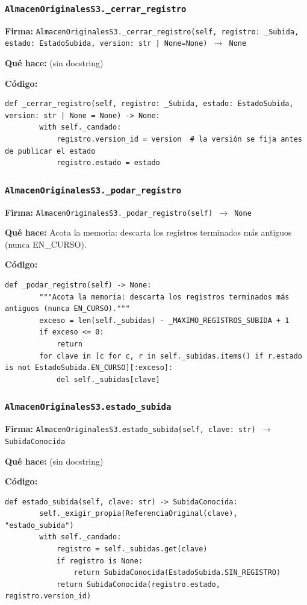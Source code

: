 \documentclass[11pt,a4paper]{article}
\begin{document}
\subsubsection*{\texttt{AlmacenOriginalesS3.\_cerrar\_registro}}
\textbf{Firma:} \texttt{AlmacenOriginalesS3.\_cerrar\_registro(self, registro: \_Subida, estado: EstadoSubida, version: str | None=None) $\rightarrow$ None}

\textbf{Qué hace:} (sin docstring)

\textbf{Código:}
\begin{lstlisting}
def _cerrar_registro(self, registro: _Subida, estado: EstadoSubida, version: str | None = None) -> None:
        with self._candado:
            registro.version_id = version  # la versión se fija antes de publicar el estado
            registro.estado = estado
\end{lstlisting}

\subsubsection*{\texttt{AlmacenOriginalesS3.\_podar\_registro}}
\textbf{Firma:} \texttt{AlmacenOriginalesS3.\_podar\_registro(self) $\rightarrow$ None}

\textbf{Qué hace:} Acota la memoria: descarta los registros terminados más antiguos (nunca EN\_CURSO).

\textbf{Código:}
\begin{lstlisting}
def _podar_registro(self) -> None:
        """Acota la memoria: descarta los registros terminados más antiguos (nunca EN_CURSO)."""
        exceso = len(self._subidas) - _MAXIMO_REGISTROS_SUBIDA + 1
        if exceso <= 0:
            return
        for clave in [c for c, r in self._subidas.items() if r.estado is not EstadoSubida.EN_CURSO][:exceso]:
            del self._subidas[clave]
\end{lstlisting}

\subsubsection*{\texttt{AlmacenOriginalesS3.estado\_subida}}
\textbf{Firma:} \texttt{AlmacenOriginalesS3.estado\_subida(self, clave: str) $\rightarrow$ SubidaConocida}

\textbf{Qué hace:} (sin docstring)

\textbf{Código:}
\begin{lstlisting}
def estado_subida(self, clave: str) -> SubidaConocida:
        self._exigir_propia(ReferenciaOriginal(clave), "estado_subida")
        with self._candado:
            registro = self._subidas.get(clave)
            if registro is None:
                return SubidaConocida(EstadoSubida.SIN_REGISTRO)
            return SubidaConocida(registro.estado, registro.version_id)
\end{lstlisting}
\end{document}

